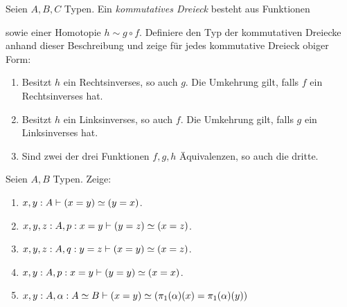 \documentclass{uebung}
\begin{document}

\begin{exercise}
  Seien $A,B,C$ Typen.
  Ein \emph{kommutatives Dreieck} besteht aus Funktionen
  \begin{center}
  \end{center}
  sowie einer Homotopie $h\sim g\circ f$.
  Definiere den Typ der kommutativen Dreiecke anhand dieser Beschreibung und zeige für jedes kommutative Dreieck obiger Form:
  \begin{enumerate}
    \item Besitzt $h$ ein Rechtsinverses, so auch $g$.
      Die Umkehrung gilt, falls $f$ ein Rechtsinverses hat.
    \item Besitzt $h$ ein Linksinverses, so auch $f$.
      Die Umkehrung gilt, falls $g$ ein Linksinverses hat.
    \item Sind zwei der drei Funktionen $f,g,h$ Äquivalenzen, so auch die dritte.
  \end{enumerate}
\end{exercise}

\begin{exercise}[Äquivalenzen I]
  Seien $A,B$ Typen.
  Zeige:
    \begin{enumerate}
      \item $x,y:A \vdash (x=y) \simeq (y=x)$.
      \item $x,y,z:A,p:x=y \vdash (y=z) \simeq (x=z)$.
      \item $x,y,z:A,q:y=z \vdash (x=y) \simeq (x=z)$.
      \item $x,y:A,p:x=y \vdash (y=y) \simeq (x=x)$.
      \item ${x,y:A, \alpha:A\simeq B \vdash (x=y) \simeq (\pi_1(\alpha)(x)=\pi_1(\alpha)(y))}$
    \end{enumerate}
\end{exercise}
\end{document}
